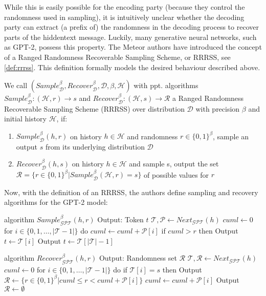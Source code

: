 While this is easily possible for the encoding party (because they control the randomness used in sampling), it is intuitively unclear whether the decoding party can extract (a prefix of) the randomness in the decoding process to recover parts of the hiddentext message.
Luckily, many generative neural networks, such as GPT-2, possess this property.
The Meteor authors have introduced the concept of a Ranged Randomness Recoverable Sampling Scheme, or RRRSS, see \autoref{def:rrrss}.
This definition formally models the desired behaviour described above.

\begin{definition}
	\label{def:rrrss}
	We call 
	$(Sample_{\mathcal{D}}^\beta, Recover_{\mathcal{D}}^\beta, \mathcal{D}, \beta, \mathcal{H})$ 
	with ppt. algorithms
	$Sample_{\mathcal{D}}^\beta \colon (\mathcal{H}, r) \rightarrow s$ 
	and 
	$Recover_{\mathcal{D}}^\beta \colon (\mathcal{H}, s) \rightarrow \mathcal{R}$ 
	a Ranged Randomness Recoverable Sampling Scheme (RRRSS) over distribution $\mathcal{D}$ with precision $\beta$ and initial history $\mathcal{H}$, if:
	
	\begin{enumerate}
		\item $Sample_{\mathcal{D}}^\beta(h, r)$ on history $h \in \mathcal{H}$ and randomness $r \in \{0,1\}^\beta$, sample an output $s$ from its underlying distribution $\mathcal{D}$
		\item $Recover_{\mathcal{D}}^\beta(h, s)$ on history $h \in \mathcal{H}$ and sample s, output the set $\mathcal{R} = \{ r \in \{0,1\}^\beta | Sample_{\mathcal{D}}^\beta(\mathcal{H}, r) = s \}$ of possible values for $r$
	\end{enumerate}
\end{definition}

Now, with the definition of an RRRSS, the authors define sampling and recovery algorithms for the GPT-2 model:

\begin{Pseudocode}[float]
algorithm $Sample_{\mathcal{GPT}}^\beta(	h, r)$
	Output: Token $t$
	$\mathcal{T}, \mathcal{P} \leftarrow Next_{\mathcal{GPT}}(h)$
	$cuml \leftarrow 0$
	for $i \in \{ 0, 1, \dots, | \mathcal{T} - 1 | \}$ do
		$cuml \leftarrow cuml + \mathcal{P}[i]$
		if $cuml > r$ then
			Output $t \leftarrow \mathcal{T}[i]$
	Output $t \leftarrow \mathcal{T}[|\mathcal{T}|-1]$
\end{Pseudocode}

\begin{Pseudocode}[float]
algorithm $Recover_{\mathcal{GPT}}^\beta(h, r)$
	Output: Randomness set $\mathcal{R}$
	$\mathcal{T}, \mathcal{R} \leftarrow Next_{\mathcal{GPT}}(h)$
	$cuml \leftarrow 0$
	for $i \in \{ 0, 1, \dots, | \mathcal{T} - 1 | \}$ do
		if $\mathcal{T}[i] = s$ then
			Output $\mathcal{R} \leftarrow \{ r \in \{ 0, 1\}^\beta | cuml \leq r < cuml + \mathcal{P}[i] \}$
		$cuml \leftarrow cuml + \mathcal{P}[i]$
	Output $\mathcal{R} \leftarrow \emptyset$
\end{Pseudocode}

